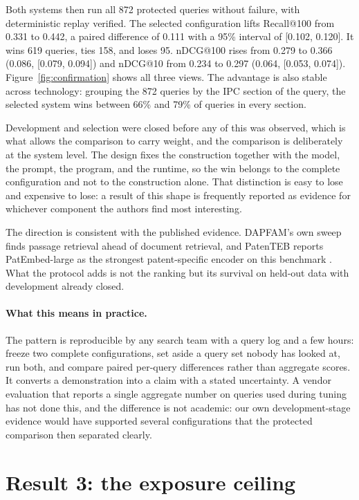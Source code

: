 \documentclass[preprint,11pt,authoryear]{elsarticle}
\begin{document}
Both systems then run all 872 protected queries without failure, with deterministic replay verified. The selected configuration lifts Recall@100 from 0.331 to 0.442, a paired difference of 0.111 with a 95\% interval of [0.102, 0.120]. It wins 619 queries, ties 158, and loses 95. nDCG@100 rises from 0.279 to 0.366 (0.086, [0.079, 0.094]) and nDCG@10 from 0.234 to 0.297 (0.064, [0.053, 0.074]). Figure~\ref{fig:confirmation} shows all three views. The advantage is also stable across technology: grouping the 872 queries by the IPC section of the query, the selected system wins between 66\% and 79\% of queries in every section.

Development and selection were closed before any of this was observed, which is what allows the comparison to carry weight, and the comparison is deliberately at the system level. The design fixes the construction together with the model, the prompt, the program, and the runtime, so the win belongs to the complete configuration and not to the construction alone. That distinction is easy to lose and expensive to lose: a result of this shape is frequently reported as evidence for whichever component the authors find most interesting.

The direction is consistent with the published evidence. DAPFAM's own sweep finds passage retrieval ahead of document retrieval, and PatenTEB reports PatEmbed-large as the strongest patent-specific encoder on this benchmark \citep{ayaou2026dapfam,ayaou2025patenteb}. What the protocol adds is not the ranking but its survival on held-out data with development already closed.

\paragraph{What this means in practice.} The pattern is reproducible by any search team with a query log and a few hours: freeze two complete configurations, set aside a query set nobody has looked at, run both, and compare paired per-query differences rather than aggregate scores. It converts a demonstration into a claim with a stated uncertainty. A vendor evaluation that reports a single aggregate number on queries used during tuning has not done this, and the difference is not academic: our own development-stage evidence would have supported several configurations that the protected comparison then separated clearly.

\section{Result 3: the exposure ceiling}
\label{sec:exposure}
\end{document}
